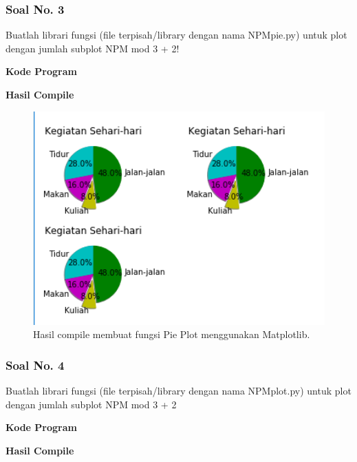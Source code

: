 \subsubsection{Soal No. 3}
\hfill \break
Buatlah librari fungsi (file terpisah/library dengan nama NPMpie.py) untuk plot dengan jumlah subplot NPM mod 3 + 2!

\hfill \break
\textbf{Kode Program}



\hfill \break
\textbf{Hasil Compile}

\begin{figure}[H]
	\includegraphics[width=12cm]{figures/6/Praktek/1174038/p3.png}
	\centering
	\caption{Hasil compile membuat fungsi Pie Plot menggunakan Matplotlib.}
\end{figure}

\subsubsection{Soal No. 4}
\hfill \break
Buatlah librari fungsi (file terpisah/library dengan nama NPMplot.py) untuk plot dengan jumlah subplot NPM mod 3 + 2

\hfill \break
\textbf{Kode Program}



\hfill \break
\textbf{Hasil Compile}

